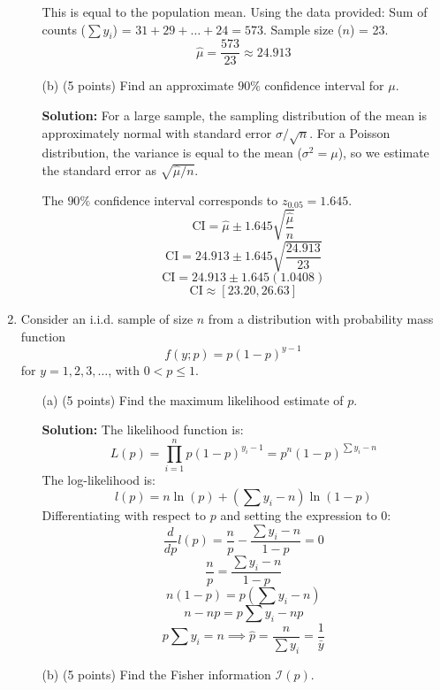 \documentclass[12pt,letterpaper]{article}
\begin{document}
\begin{enumerate}[leftmargin=*]
\begin{itemize}
    This is equal to the population mean. Using the data provided:
    Sum of counts ($\sum y_i$) = $31+29+\dots+24 = 573$.
    Sample size ($n$) = 23.
    \[ \hat{\mu} = \frac{573}{23} \approx 24.913 \]
    
    \item[(b)] (5 points) Find an approximate $90\%$ confidence interval for $\mu$.
    
    \textbf{Solution:}
    For a large sample, the sampling distribution of the mean is approximately normal with standard error $\sigma/\sqrt{n}$. For a Poisson distribution, the variance is equal to the mean ($\sigma^2 = \mu$), so we estimate the standard error as $\sqrt{\hat{\mu}/n}$.
    
    The $90\%$ confidence interval corresponds to $z_{0.05} = 1.645$.
    \[ \text{CI} = \hat{\mu} \pm 1.645 \sqrt{\frac{\hat{\mu}}{n}} \]
    \[ \text{CI} = 24.913 \pm 1.645 \sqrt{\frac{24.913}{23}} \]
    \[ \text{CI} = 24.913 \pm 1.645(1.0408) \]
    \[ \text{CI} \approx [23.20, 26.63] \]
\end{itemize}

\item Consider an i.i.d. sample of size $n$ from a distribution with probability mass function
\begin{equation*}
f(y; p) = p(1-p)^{y-1}
\end{equation*}
for $y = 1, 2, 3, \dots$, with $0 < p \leq 1$.
\begin{itemize}
    \item [(a)] (5 points) Find the maximum likelihood estimate of $p$.
    
    \textbf{Solution:}
    The likelihood function is:
    \[ L(p) = \prod_{i=1}^{n} p(1-p)^{y_i-1} = p^n (1-p)^{\sum y_i - n} \]
    The log-likelihood is:
    \[ l(p) = n \ln(p) + (\sum y_i - n) \ln(1-p) \]
    Differentiating with respect to $p$ and setting the expression to 0:
    \[ \frac{d}{dp} l(p) = \frac{n}{p} - \frac{\sum y_i - n}{1-p} = 0 \]
    \[ \frac{n}{p} = \frac{\sum y_i - n}{1-p} \]
    \[ n(1-p) = p(\sum y_i - n) \]
    \[ n - np = p \sum y_i - np \]
    \[ p \sum y_i = n \implies \hat{p} = \frac{n}{\sum y_i} = \frac{1}{\bar{y}} \]
    
    \item[(b)] (5 points) Find the Fisher information $\mathcal{I}(p)$.
    

\end{itemize}
\end{enumerate}
\end{document}
